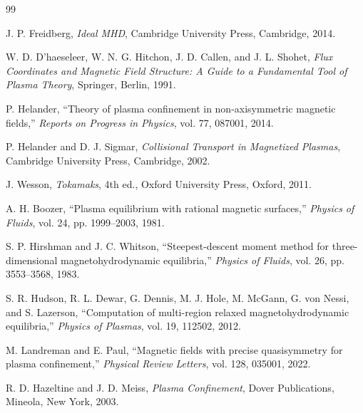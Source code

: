 \renewcommand{\refname}{References and further reading}
{}
\label{sec:references}
\begin{thebibliography}{99}

J. P. Freidberg,
\textit{Ideal MHD},
Cambridge University Press, Cambridge, 2014.

W. D. D'haeseleer, W. N. G. Hitchon, J. D. Callen, and J. L. Shohet,
\textit{Flux Coordinates and Magnetic Field Structure: A Guide to a Fundamental Tool of Plasma Theory},
Springer, Berlin, 1991.

P. Helander,
``Theory of plasma confinement in non-axisymmetric magnetic fields,''
\textit{Reports on Progress in Physics}, vol. 77, 087001, 2014.

P. Helander and D. J. Sigmar,
\textit{Collisional Transport in Magnetized Plasmas},
Cambridge University Press, Cambridge, 2002.

J. Wesson,
\textit{Tokamaks}, 4th ed.,
Oxford University Press, Oxford, 2011.

A. H. Boozer,
``Plasma equilibrium with rational magnetic surfaces,''
\textit{Physics of Fluids}, vol. 24, pp. 1999--2003, 1981.

S. P. Hirshman and J. C. Whitson,
``Steepest-descent moment method for three-dimensional magnetohydrodynamic equilibria,''
\textit{Physics of Fluids}, vol. 26, pp. 3553--3568, 1983.

S. R. Hudson, R. L. Dewar, G. Dennis, M. J. Hole, M. McGann, G. von Nessi, and S. Lazerson,
``Computation of multi-region relaxed magnetohydrodynamic equilibria,''
\textit{Physics of Plasmas}, vol. 19, 112502, 2012.

M. Landreman and E. Paul,
``Magnetic fields with precise quasisymmetry for plasma confinement,''
\textit{Physical Review Letters}, vol. 128, 035001, 2022.

R. D. Hazeltine and J. D. Meiss,
\textit{Plasma Confinement},
Dover Publications, Mineola, New York, 2003.

\end{thebibliography}

